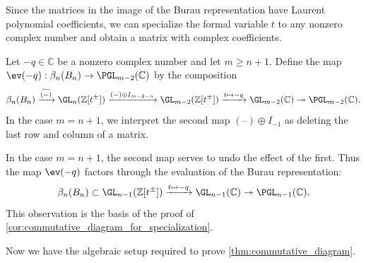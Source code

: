 \documentclass{amsart}
\begin{document}
    Since the matrices in the image of the Burau representation have Laurent polynomial coefficients, we can specialize the formal variable $t$ to any nonzero complex number and obtain a matrix with complex coefficients.

    \begin{definition}\label{def:eval_of_ext}
        Let $-q \in \mathbb C$ be a nonzero complex number and let $m \geq n+1$. Define the map $\ev(-q):\beta_n(B_n) \to \PGL_{m-2}(\mathbb C)$ by the composition
        \begin{equation*}
            \beta_n(B_n) \xrightarrow{\widetilde{(-)}} \GL_n(\mathbb Z[t^\pm]) \xrightarrow{(-) \oplus I_{m-2-n}} \GL_{m-2}(\mathbb Z[t^\pm]) \xrightarrow{t \mapsto -q} \GL_{m-2}(\mathbb C) \twoheadrightarrow \PGL_{m-2}(\mathbb C).
        \end{equation*}
        In the case $m=n+1$, we interpret the second map $(\text{--}) \oplus I_{-1}$ as deleting the last row and column of a matrix.
    \end{definition}

    \begin{remark}\label{rmk:factors_through_evaluation}
        In the case $m=n+1$, the second map serves to undo the effect of the first. Thus the map $\ev(-q)$ factors through the evaluation of the Burau representation:
        \begin{equation*}
            \beta_n(B_n) \subset \GL_{n-1}(\mathbb Z[t^\pm]) \xrightarrow{t \mapsto -q} \GL_{n-1}(\mathbb C) \twoheadrightarrow \PGL_{n-1}(\mathbb C).
        \end{equation*}
        This observation is the basis of the proof of \cref{cor:commutative_diagram_for_specialization}.
    \end{remark}

    Now we have the algebraic setup required to prove \cref{thm:commutative_diagram}.
    
\end{document}
